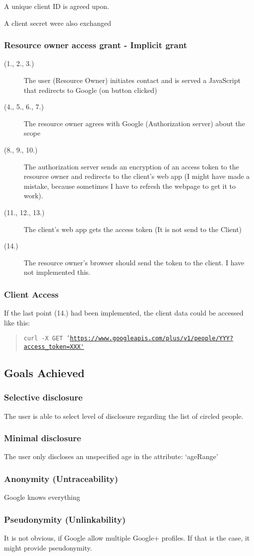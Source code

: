 \documentclass[12pt, a4paper]{article}
\begin{document}
A unique client ID is agreed upon.

A client secret were also exchanged

\subsubsection*{Resource owner access grant - Implicit grant}
\begin{description}
  \item[(1., 2., 3.)] The user (Resource Owner) initiates contact and is served a
JavaScript that redirects to Google (on button clicked)
\item[(4., 5., 6., 7.)] The resource owner agrees with Google (Authorization
server) about the scope
\item[(8., 9., 10.)] The authorization server sends an encryption of an access
token to the resource owner and redirects to the client’s web app (I
might have made a mistake, because sometimes I have to refresh the
webpage to get it to work).
\item[(11., 12., 13.)] The client's web app gets the access token (It is not
send to the Client)
\item[(14.)] The resource owner’s browser should send the token to the client.
I have not implemented this.
\end{description}

\subsubsection*{Client Access}
If the last point (14.) had been implemented, the client data could be
accessed like this:
\begin{quote}{\tt curl -X GET
    '\url{https://www.googleapis.com/plus/v1/people/YYY?access\_token=XXX'}}\end{quote}

\subsection*{Goals Achieved}
\subsubsection*{Selective disclosure}
The user is able to select level of disclosure regarding the list of
circled people.
\subsubsection*{Minimal disclosure}
The user only discloses an unspecified age in the attribute: ‘ageRange’
\subsubsection*{Anonymity (Untraceability)}
Google knows everything
\subsubsection*{Pseudonymity (Unlinkability)}
It is not obvious, if Google allow multiple Google+ profiles. If that is
the case, it might provide pseudonymity.

\end{document}
